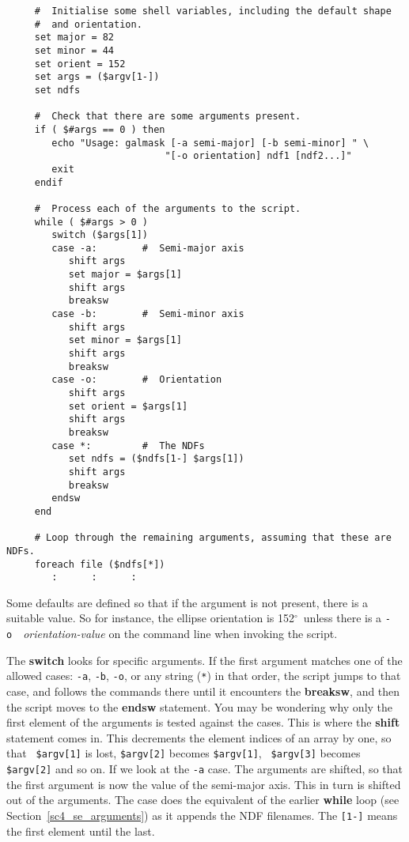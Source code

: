 \documentclass[twoside,11pt]{article}
\newcommand{\htmlref}[2]{#1}
\newcommand{\latex}[1]{#1}
\newcommand{\dgs}{\hbox{$^\circ$}}
\begin{document}
\small
\begin{verbatim}
     #  Initialise some shell variables, including the default shape
     #  and orientation.
     set major = 82
     set minor = 44
     set orient = 152
     set args = ($argv[1-])
     set ndfs

     #  Check that there are some arguments present.
     if ( $#args == 0 ) then
        echo "Usage: galmask [-a semi-major] [-b semi-minor] " \
                            "[-o orientation] ndf1 [ndf2...]"
        exit
     endif

     #  Process each of the arguments to the script.
     while ( $#args > 0 )
        switch ($args[1])
        case -a:        #  Semi-major axis
           shift args
           set major = $args[1]
           shift args
           breaksw
        case -b:        #  Semi-minor axis
           shift args
           set minor = $args[1]
           shift args
           breaksw
        case -o:        #  Orientation
           shift args
           set orient = $args[1]
           shift args
           breaksw
        case *:         #  The NDFs
           set ndfs = ($ndfs[1-] $args[1])
           shift args
           breaksw
        endsw
     end

     # Loop through the remaining arguments, assuming that these are NDFs.
     foreach file ($ndfs[*])
        :      :      :
\end{verbatim}
\normalsize
Some defaults are defined so that if the argument is not present,
there is a suitable value.  So for instance, the ellipse orientation
is 152\dgs\ unless there is a \mbox{{\tt -o} {\em
orientation-value\/}} on the command line when invoking the script.

The {\bf switch} looks for specific arguments.  If the first argument
matches one of the allowed cases: {\tt -a}, {\tt -b}, {\tt -o}, or any
string ({\tt{*}}) in that order, the script jumps to that case, and
follows the commands there until it encounters the {\bf breaksw}, and
then the script moves to the {\bf endsw} statement.  You may be
wondering why only the first element of the arguments is tested against
the cases.  This is where the {\bf shift} statement comes in.  This
decrements the element indices of an array by one, so that {\tt
\$argv[1]} is lost, {\tt \$argv[2]} becomes {\tt \$argv[1]}, {\tt
\$argv[3]} becomes {\tt \$argv[2]} and so on.  If we look at the
{\tt -a} case.  The arguments are shifted, so that the first argument
is now the value of the semi-major axis.  This in turn is shifted out
of the arguments.  The \htmlref{{\tt *} case}{sc4_se_arguments} does
the equivalent of the earlier {\bf while} loop \latex{(see
Section~\ref{sc4_se_arguments})} as it appends the NDF filenames.  The
{\tt [1-]} means the first element until the last.
\end{document}

